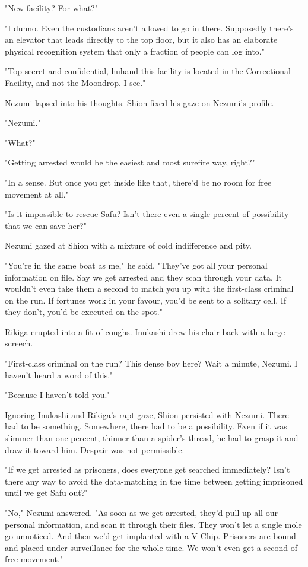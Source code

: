 "New facility? For what?"

"I dunno. Even the custodians aren't allowed to go in there. Supposedly
there's an elevator that leads directly to the top floor, but it also
has an elaborate physical recognition system that only a fraction of
people can log into."

"Top-secret and confidential, huh\el and this facility is located in the
Correctional Facility, and not the Moondrop. I see."

Nezumi lapsed into his thoughts. Shion fixed his gaze on Nezumi's
profile.

"Nezumi."

"What?"

"Getting arrested would be the easiest and most surefire way, right?"

"In a sense. But once you get inside like that, there'd be no room for
free movement at all."

"Is it impossible to rescue Safu? Isn't there even a single percent of
possibility that we can save her?"

Nezumi gazed at Shion with a mixture of cold indifference and pity.

"You're in the same boat as me," he said. "They've got all your personal
information on file. Say we get arrested and they scan through your
data. It wouldn't even take them a second to match you up with the
first-class criminal on the run. If fortunes work in your favour, you'd
be sent to a solitary cell. If they don't, you'd be executed on the
spot."

Rikiga erupted into a fit of coughs. Inukashi drew his chair back with a
large screech.

"First-class criminal on the run? This dense boy here? Wait a minute,
Nezumi. I haven't heard a word of this."

"Because I haven't told you."

Ignoring Inukashi and Rikiga's rapt gaze, Shion persisted with Nezumi.
There had to be something. Somewhere, there had to be a possibility.
Even if it was slimmer than one percent, thinner than a spider's thread,
he had to grasp it and draw it toward him. Despair was not permissible.

"If we get arrested as prisoners, does everyone get searched
immediately? Isn't there any way to avoid the data-matching in the time
between getting imprisoned until we get Safu out?"

"No," Nezumi answered. "As soon as we get arrested, they'd pull up all
our personal information, and scan it through their files. They won't
let a single mole go unnoticed. And then we'd get implanted with a
V-Chip. Prisoners are bound and placed under surveillance for the whole
time. We won't even get a second of free movement."

